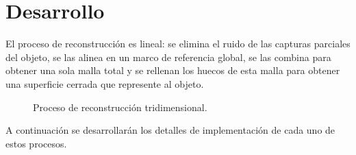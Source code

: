 \chapter{Desarrollo}
El proceso de reconstrucción es lineal:
se elimina el ruido de las capturas parciales del objeto,
se las alinea en un marco de referencia global,
se las combina para obtener una sola malla total
y se rellenan los huecos de esta malla para obtener una superficie cerrada que represente al objeto.

\begin{figure}[h]
	\caption{\label{fig:proceso_de_reconstrucción}Proceso de reconstrucción tridimensional.}
\end{figure}

A continuación se desarrollarán los detalles de implementación de cada uno de estos procesos.






